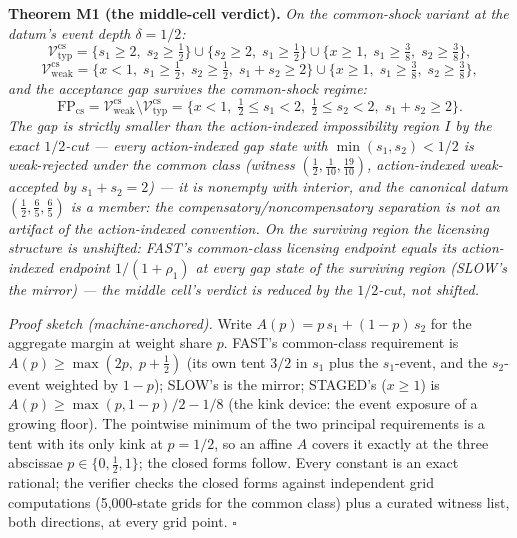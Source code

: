 \documentclass[3p,11pt]{elsarticle}
\begin{document}
\textbf{Theorem M1 (the middle-cell verdict).} \emph{On the common-shock
variant at the datum's event depth \(\delta = 1/2\):}
\[
\mathcal{V}_{\mathrm{typ}}^{\mathrm{cs}}
= \{ s_1 \ge 2,\; s_2 \ge \tfrac12 \}
\cup \{ s_2 \ge 2,\; s_1 \ge \tfrac12 \}
\cup \{ x \ge 1,\; s_1 \ge \tfrac38,\; s_2 \ge \tfrac38 \},
\]
\[
\mathcal{V}_{\mathrm{weak}}^{\mathrm{cs}}
= \{ x < 1,\; s_1 \ge \tfrac12,\; s_2 \ge \tfrac12,\; s_1 + s_2 \ge 2 \}
\cup \{ x \ge 1,\; s_1 \ge \tfrac38,\; s_2 \ge \tfrac38 \},
\]
\emph{and the acceptance gap survives the common-shock regime:}
\[
\mathrm{FP}_{\mathrm{cs}}
= \mathcal{V}_{\mathrm{weak}}^{\mathrm{cs}} \setminus
\mathcal{V}_{\mathrm{typ}}^{\mathrm{cs}}
= \{ x < 1,\; \tfrac12 \le s_1 < 2,\; \tfrac12 \le s_2 < 2,\;
s_1 + s_2 \ge 2 \}.
\]
\emph{The gap is strictly smaller than the action-indexed impossibility
region \(I\) by the exact \(1/2\)-cut --- every action-indexed gap
state with \(\min(s_1, s_2) < 1/2\) is weak-rejected under the common
class (witness \((\tfrac12, \tfrac1{10}, \tfrac{19}{10})\),
action-indexed weak-accepted by \(s_1 + s_2 = 2\)) --- it is nonempty
with interior, and the canonical datum \((\tfrac12, \tfrac65,
\tfrac65)\) is a member: the compensatory/noncompensatory separation
is not an artifact of the action-indexed convention. On the surviving
region the licensing structure is unshifted: FAST's common-class
licensing endpoint equals its action-indexed endpoint \(1/(1 +
\rho_1)\) at every gap state of the surviving region (SLOW's the
mirror) --- the middle cell's verdict is reduced by the \(1/2\)-cut,
not shifted.}

\emph{Proof sketch (machine-anchored).} Write \(A(p) = p\, s_1 +
(1 - p)\, s_2\) for the aggregate margin at weight share \(p\).
FAST's common-class requirement is \(A(p) \ge \max(2p,\; p +
\tfrac12)\) (its own tent \(3/2\) in \(s_1\) plus the
\(s_1\)-event, and the \(s_2\)-event weighted by \(1 - p\));
SLOW's is the mirror; STAGED's (\(x \ge 1\)) is \(A(p) \ge
\max(p, 1 - p)/2 - 1/8\) (the kink device: the event exposure of a
growing floor). The pointwise minimum of the two principal requirements
is a tent with its only kink at \(p = 1/2\), so an affine \(A\)
covers it exactly at the three abscissae \(p \in \{0, \tfrac12,
1\}\); the closed forms follow. Every constant is an exact rational;
the verifier checks the closed forms against independent grid
computations (5{,}000-state grids for the common class) plus a curated
witness list, both directions, at every grid point. \ensuremath{\square}
\end{document}
